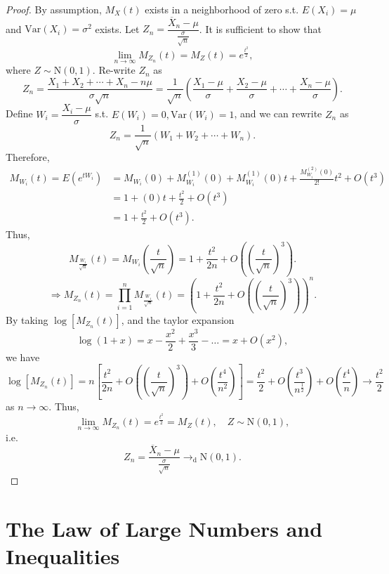\documentclass[12pt]{report}
\theoremstyle{definition}
\begin{document}
\begin{proof}
    By assumption, $M_X(t)$ exists in a neighborhood of zero s.t. $E(X_i)=\mu$
    and $\text{Var}(X_i)=\sigma^2$ exists. Let
    $Z_n=\dfrac{\overline{X}_n-\mu}{\frac{\sigma}{\sqrt{n}}}$. It is sufficient
    to show that
    \[
        \lim_{n\rightarrow\infty}M_{Z_n}(t)=M_Z(t)=e^{\frac{t^2}{2}},
    \]
    where $Z\sim\text{N}(0,1)$. Re-write $Z_n$ as\[
        Z_n=\frac{X_1+X_2+\cdots+X_n-n\mu}{\sigma\sqrt{n}}
        =\frac{1}{\sqrt{n}}\left(\frac{X_1-\mu}{\sigma}+\frac{X_2-\mu}{\sigma}+\cdots+\frac{X_n-\mu}{\sigma}\right).
    \]
    Define $W_i=\dfrac{X_i-\mu}{\sigma}$ s.t. $E(W_i)=0, \text{Var}(W_i)=1$,
    and we can rewrite $Z_n$ as\[
        Z_n=\frac{1}{\sqrt{n}}\left(W_1+W_2+\cdots+W_n\right).
    \]
    Therefore,
    \begin{align*}
        M_{W_i}(t)=E\left(e^{tW_i}\right)
        & =
        M_{W_i}(0)+M_{W_i}^{(1)}(0)+M_{W_i}^{(1)}(0)t+\frac{M_{W_i}^{(2)}(0)}{2!}t^{2}+O(t^3)\\
        & = 1 + (0)t + \frac{t^2}{2} + O(t^3) \\
        & = 1 + \frac{t^2}{2} + O(t^3).
    \end{align*} 
    Thus,
    \[
        M_{\frac{W_i}{\sqrt{n}}}(t)=M_{W_i}\left(\frac{t}{\sqrt{n}}\right)
        =1+\frac{t^2}{2n}+O\left({\left(\frac{t}{\sqrt{n}}\right)}^{3}\right).
    \]
    \[
        \Longrightarrow
        M_{Z_n}(t)=\prod_{i=1}^{n} M_{\frac{W_i}{\sqrt{n}}}(t)
        ={\left(1+\frac{t^2}{2n}+O\left({\left(\frac{t}{\sqrt{n}}\right)}^{3}\right)\right)}^{n}.
    \]
    By taking $\log[M_{Z_n}(t)]$, and the taylor expansion
    \[
        \log(1+x)=x-\frac{x^2}{2}+\frac{x^3}{3}-\ldots=x+O(x^2),
    \]
    we have
    \[
        \log[M_{Z_n}(t)]=n\left[\frac{t^2}{2n}+O\left({\left(\frac{t}{\sqrt{n}}\right)}^{3}\right)
        +O\left(\frac{t^4}{n^2}\right)\right]
        =\frac{t^2}{2}+O\left(\frac{t^3}{n^{\frac{1}{2}}}\right)
        +O\left(\frac{t^4}{n}\right) \longrightarrow \frac{t^2}{2}
    \]
    as $n\rightarrow\infty$. Thus,
    \[
        \lim_{n\rightarrow\infty}M_{Z_n}(t)=e^{\frac{t^2}{2}}=M_Z(t),
        \quad Z\sim\text{N}(0,1),
    \]
    i.e.\
    \[
        Z_n=\dfrac{\overline{X}_n-\mu}{\frac{\sigma}{\sqrt{n}}}
        \rightarrow_\text{d}\text{N}(0,1).
    \]
\end{proof} 

\section{The Law of Large Numbers and Inequalities}
\end{document}

